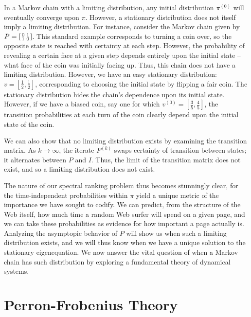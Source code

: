 \documentclass[12pt]{article}
\newcommand{\iterate}[2]{#1^{(#2)}}
\begin{document}
In a Markov chain with a limiting distribution, any initial distribution
$\iterate{\pi}{0}$ will eventually converge upon $\pi$. However, a stationary
distribution does not itself imply a limiting distribution. For instance,
consider the Markov chain given by
$P=\begin{bsmallmatrix} 0 & 1 \\ 1 & 0 \end{bsmallmatrix}$. This standard
example corresponds to turning a coin over, so the opposite state is reached
with certainty at each step. However, the probability of revealing a certain
face at a given step depends entirely upon the initial state -- what face of the
coin was initially facing up. Thus, this chain does not have a limiting
distribution. However, we have an easy stationary distribution:
$v = [\frac{1}{2}, \frac{1}{2}]$, corresponding to choosing the initial state by
flipping a fair coin. The stationary distribution hides the chain's dependence
upon its initial state. However, if we have a biased coin, say one for which
$\iterate{v}{0} = [\frac{3}{5}, \frac{4}{5}]$, the transition probabilities at
each turn of the coin clearly depend upon the initial state of the coin.

We can also show that no limiting distribution exists by examining the
transition matrix. As $k\to\infty$, the iterate $\iterate{P}{k}$ swaps certainty
of transition between states; it alternates between $P$ and $I$. Thus, the limit
of the transition matrix does not exist, and so a limiting distribution does not
exist.

The nature of our spectral ranking problem thus becomes stunningly clear, for
the time-independent probabilities within $\pi$ yield a unique metric of the
importance we have sought to codify. We can predict, from the structure of the
Web itself, how much time a random Web surfer will spend on a given page, and we
can take these probabilities as evidence for how important a page actually is.
Analyzing the asymptopic behavior of $P$ will show us when such a limiting
distribution exists, and we will thus know when we have a unique solution to the
stationary eigenequation. We now answer the vital question of when a Markov
chain has such distribution by exploring a fundamental theory of dynamical
systems.




\section{Perron-Frobenius Theory}
\end{document}
